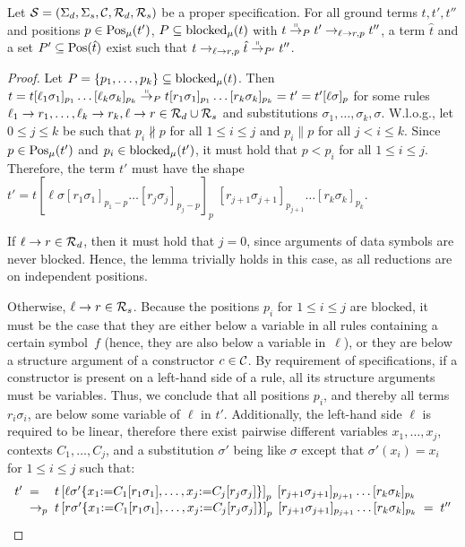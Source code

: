 \documentclass{eptcs}
\begin{document}
\begin{lemma}
\label{lem:SpecialPML}
Let $\mathcal{S} = (\Sigma_d,\Sigma_s,\mathcal{C},\mathcal{R}_d,\mathcal{R}_s)$ be a proper specification.
For all ground terms $t, t', t''$ and positions $p \in \mathrm{Pos}_\mu(t')$,
$P \subseteq \mathrm{blocked}_{\mu}(t)$ with $t \mathrel{\smash{\overset{\shortparallel}{\rightarrow}}}_P t' \to_{\ell \to r, p} t''$,
a term $\hat{t}$ and a set $P' \subseteq \mathrm{Pos}(\hat{t})$ exist such that
$t \to_{\ell \to r, p} \hat{t} \mathrel{\smash{\overset{\shortparallel}{\rightarrow}}}_{P'} t''$.
\end{lemma}

\begin{proof}
Let $P = \{ p_1, \dotsc, p_k \} \subseteq \mathrm{blocked}_{\mu}(t)$.
Then $t = t [\ell_1\sigma_1]_{p_1} \ldots [\ell_k\sigma_k]_{p_k}
\mathrel{\smash{\overset{\shortparallel}{\rightarrow}}}_P
t [r_1\sigma_1]_{p_1} \ldots [r_k\sigma_k]_{p_k} = t'
= t'[\ell\sigma]_{p}
$ for some rules
$\ell_1 \to r_1, \dotsc, \ell_k \to r_k, \ell \to r \in \mathcal{R}_d \cup \mathcal{R}_s$ and
substitutions $\sigma_1, \dotsc, \sigma_k, \sigma$.
W.l.o.g., let $0 \le j \le k$ be such that
$p_i \not\parallel p$ for all $1 \le i \le j$
and $p_i \parallel p$ for all $j < i \le k$.
Since $p \in \mathrm{Pos}_\mu(t')$ and $p_i \in \mathrm{blocked}_{\mu}(t')$, it must
hold that $p < p_i$ for all $1 \le i \le j$.
Therefore, the term $t'$ must have the shape
$
t' = t\left[ \ell\sigma
        [r_1\sigma_1]_{p_1 - p} \ldots [r_j\sigma_j]_{p_j-p}
\right]_{p}\;
    [r_{j+1}\sigma_{j+1}]_{p_{j+1}} \ldots [r_k\sigma_k]_{p_k}
$.

If $\ell \to r \in \mathcal{R}_d$, then it must hold that $j=0$, since arguments of data
symbols are never blocked. Hence, the lemma trivially holds in this case, as all
reductions are on independent positions.

Otherwise, $\ell \to r \in \mathcal{R}_s$.
Because the positions $p_i$ for $1 \le i \le j$ are blocked, it must be the case
that they are either below a variable in all rules containing a certain
symbol~$f$ (hence, they are also below a variable in~$\ell$), or they are
below a structure argument of a constructor $c \in \mathcal{C}$. By requirement of
specifications, if a constructor is present on a left-hand side of a rule, all
its structure arguments must be variables. Thus, we conclude that all positions
$p_i$, and thereby all terms $r_i\sigma_i$, are below some variable of
$\ell$ in $t'$. Additionally, the left-hand side $\ell$ is required to be
linear, therefore there exist pairwise different variables $x_1, \dotsc, x_j$,
contexts $C_1, \dotsc, C_j$, and a substitution $\sigma'$ being like $\sigma$
except that $\sigma'(x_i) = x_i$ for $1 \le i \le j$ such that:
\[
\begin{array}{r@{\;\;}l@{\;\;}l@{\;\;}c@{\;\;}l}
t' &=&
t\left[ \ell\sigma'
        \{
            x_1 {:=} C_1[r_1\sigma_1], \dotsc, x_j {:=} C_j[r_j\sigma_j]
        \}
\right]_{p}\;
    [r_{j+1}\sigma_{j+1}]_{p_{j+1}} \ldots [r_k\sigma_k]_{p_k}
\\
&\to_{p}&
t\left[ r\sigma'
        \{
            x_1 {:=} C_1[r_1\sigma_1], \dotsc, x_j {:=} C_j[r_j\sigma_j]
        \}
\right]_{p}\;
    [r_{j+1}\sigma_{j+1}]_{p_{j+1}} \ldots [r_k\sigma_k]_{p_k}
&=& t''
\end{array}
\]


\end{proof}
\end{document}

